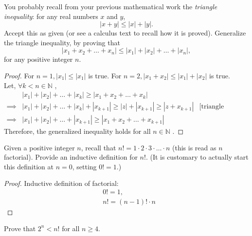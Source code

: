 \documentclass[12pt]{article}
\newenvironment{problem}[2][Problem]{\begin{trivlist}
\item[\hskip \labelsep {\bfseries #1}\hskip \labelsep {\bfseries #2.}]}{\end{trivlist}}
\begin{document}
\begin{problem}{3}
    You probably recall from your previous mathematical work the \textit{triangle inequality}: 
for any real numbers \( x \) and \( y \),
\[
|x + y| \leq |x| + |y|.
\]
Accept this as given (or see a calculus text to recall how it is proved). Generalize the triangle inequality, by proving that
\[
|x_1 + x_2 + \dots + x_n| \leq |x_1| + |x_2| + \dots + |x_n|,
\]
for any positive integer \( n \).

\end{problem}

\begin{proof}
For $n = 1, |x_1| \leq |x_1|$ is true. 
For $n = 2, |x_1 + x_2| \leq |x_1| + |x_2|$ is true. \\
Let, $\forall k < n \in \mathbb{N}$ ,
\begin{align*}
   & |x_1| + |x_2| + \dots + |x_k| \geq |x_1 + x_2 + \dots + x_k| \\
   \implies & |x_1| + |x_2| + \dots + |x_k| + |x_ {k+1}|\geq |z| + |x_{k+1}| \geq |z + x_{k+1}| & \text{[triangle inequality]} \\
   \implies & |x_1| + |x_2| + \dots  + |x_ {k+1}| \geq |x_1 + x_2 + \dots + x_{k+1}|
\end{align*}
Therefore, the generalized inequality holds for all $n \in \mathbb{N}$ .

\end{proof}

\begin{problem}{4}
    Given a positive integer \( n \), recall that \( n! = 1 \cdot 2 \cdot 3 \cdot \dots \cdot n \) (this is read as \( n \) factorial).
Provide an inductive definition for \( n! \). (It is customary to actually start this definition
at \( n = 0 \), setting \( 0! = 1 \).)

\end{problem}

\begin{proof}
Inductive definition of factorial:
\begin{align*}
    & 0! = 1, \\
& n! = (n-1)! \cdot n
\end{align*}

\end{proof}

\begin{problem}{5}
Prove that \( 2^n < n! \) for all \( n \geq 4 \).

\end{problem}
\end{document}
